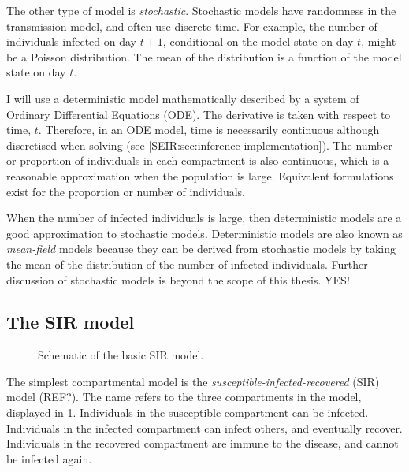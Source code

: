 \documentclass[thesis.tex]{subfiles}
\begin{document}
The other type of model is \emph{stochastic}.
Stochastic models have randomness in the transmission model, and often use discrete time.
For example, the number of individuals infected on day $t+1$, conditional on the model state on day $t$, might be a Poisson distribution.
The mean of the distribution is a function of the model state on day $t$.

I will use a deterministic model mathematically described by a system of Ordinary Differential Equations (ODE).
The derivative is taken with respect to time, $t$.
Therefore, in an ODE model, time is necessarily continuous although discretised when solving (see \cref{SEIR:sec:inference-implementation}).
The number or proportion of individuals in each compartment is also continuous, which is a reasonable approximation when the population is large.
Equivalent formulations exist for the proportion or number of individuals.

When the number of infected individuals is large, then deterministic models are a good approximation to stochastic models.
Deterministic models are also known as \emph{mean-field} models because they can be derived from stochastic models by taking the mean of the distribution of the number of infected individuals.
Further discussion of stochastic models is beyond the scope of this thesis.
 YES!


\subsection{The SIR model}
\begin{figure}[h]
\centering
{}
  \caption[The SIR model]{Schematic of the basic SIR model.}
  \label{SEIR:fig:SIR}
\end{figure}

The simplest compartmental model is the \emph{susceptible-infected-recovered} (SIR) model (REF?).
The name refers to the three compartments in the model, displayed in \cref{SEIR:fig:SIR}.
Individuals in the susceptible compartment can be infected.
Individuals in the infected compartment can infect others, and eventually recover.
Individuals in the recovered compartment are immune to the disease, and cannot be infected again.
\end{document}
